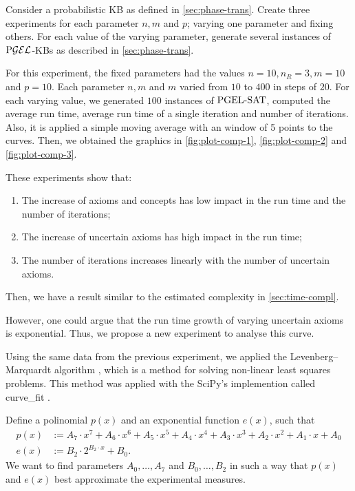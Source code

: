 Consider a probabilistic KB as defined in \autoref{sec:phase-trans}. Create three experiments for each parameter $n, m$ and $p$; varying one parameter and fixing others. For each value of the varying parameter, generate several instances of $\text{P}\mathcal{GEL}$-KBs as described in \autoref{sec:phase-trans}.

For this experiment, the fixed parameters had the values $n = 10, n_R = 3, m = 10$ and $p = 10$. Each parameter $n, m$ and $m$ varied from $10$ to $400$ in steps of $20$. For each varying value, we generated $100$ instances of $\text{PGEL-SAT}$, computed the average run time, average run time of a single iteration and number of iterations. Also, it is applied a simple moving average with an window of 5 points to the curves.  Then, we obtained the graphics in \autoref{fig:plot-comp-1}, \autoref{fig:plot-comp-2} and \autoref{fig:plot-comp-3}. 

These experiments show that:
\begin{enumerate}[label=(\alph*)]
  \item The increase of axioms and concepts has low impact in the run time and the number of iterations;
  \item The increase of uncertain axioms has high impact in the run time;
  \item The number of iterations increases linearly with the number of uncertain axioms.
\end{enumerate}
Then, we have a result similar to the estimated complexity in \autoref{sec:time-compl}.

However, one could argue that the run time growth of varying uncertain axioms is exponential. Thus, we propose a new experiment to analyse this curve.

Using the same data from the previous experiment, we applied the Levenberg–Marquardt algorithm \citep{levenberg1944method,marquardt1963algorithm}, which is a method for solving non-linear least squares problems. This method was applied with the SciPy's implemention called \textsf{curve\_fit} \citep{2020SciPy-NMeth}. 

Define a polinomial $p(x)$ and an exponential function $e(x)$, such that
\begin{align*}
  p(x) &:= A_7 \cdot x^7 + A_6 \cdot x^6 + A_5 \cdot x^5 +A_4 \cdot x^4 + A_3 \cdot x^3 + A_2 \cdot x^2 + A_1 \cdot x + A_0\\
  e(x) &:= B_2 \cdot 2^{B_2 \cdot x} + B_0.
\end{align*}
We want to find parameters $A_0, \dots, A_7$ and $B_0, \dots, B_2$ in such a way that $p(x)$ and $e(x)$ best approximate the experimental measures. 

